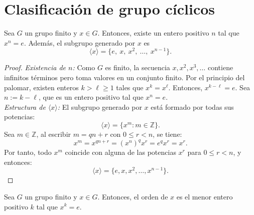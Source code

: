 \section{Clasificación de grupo cíclicos}




\begin{definicion}
\end{definicion}

\begin{proposicion}\label{lkjhgfñ-lkj}
	\upshape
	Sea \( G \) un grupo finito y \( x \in G \). Entonces, existe un entero positivo \( n \) tal que \( x^n = e \). Además, el subgrupo generado por \( x \) es
	\[
	\langle x \rangle = \{ e,\ x,\ x^2,\ \dots,\ x^{n-1} \}.
	\]
\end{proposicion}

\begin{proof}
	\noindent\textit{Existencia de \( n \):} Como \( G \) es finito, la secuencia \( x, x^2, x^3, \dots \) contiene infinitos términos pero toma valores en un conjunto finito. Por el principio del palomar, existen enteros \( k > \ell \geq 1 \) tales que \( x^k = x^\ell \). Entonces, $ x^{k - \ell} = e$. Sea \( n := k - \ell \), que es un entero positivo tal que \( x^n = e \).\\
	

	
	\noindent\textit{Estructura de \( \langle x \rangle \):} El subgrupo generado por \( x \) está formado por todas sus potencias:
	\[
	\langle x \rangle = \{ x^m : m \in \mathbb{Z} \}.
	\]
	Sea \( m \in \mathbb{Z} \), al escribir \( m = qn + r \) con \( 0 \leq r < n \), se tiene:
	\[
	x^m = x^{qn + r} = (x^n)^q x^r = e^q x^r = x^r.
	\]
	Por tanto, todo \( x^m \) coincide con alguna de las potencias \( x^r \) para \( 0 \leq r < n \), y entonces:
	\[
	\langle x \rangle = \{ e, x, x^2, \dots, x^{n-1} \}.
	\]
\end{proof}

\begin{definicion}
\end{definicion}

\begin{proposicion}
	\upshape
	Sea \( G \) un grupo finito y \( x \in G \). Entonces, el orden de \( x \) es el menor entero positivo \( k \) tal que \( x^k = e \).
\end{proposicion}

